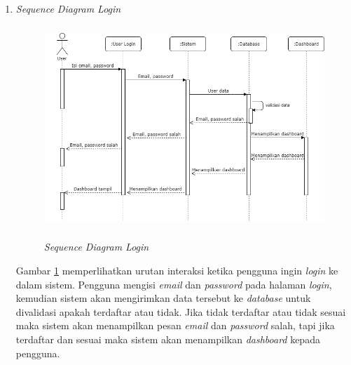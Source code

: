\begin{enumerate}
	\item \textit{Sequence Diagram Login}
	\begin{figure}[H]
		\centering
		{\includegraphics [width = 12cm, height= 7.6cm]{gambar/sequence/login}}
		\caption{\textit{Sequence Diagram Login}}
		\label{seq login}
	\end{figure}
	\par Gambar \ref*{seq login} memperlihatkan urutan interaksi ketika pengguna ingin \textit{login} ke dalam sistem. Pengguna mengisi \textit{email} dan \textit{password} pada halaman \textit{login}, kemudian sistem akan mengirimkan data tersebut ke \textit{database} untuk divalidasi apakah terdaftar atau tidak. Jika tidak terdaftar atau tidak sesuai maka sistem akan menampilkan pesan \textit{email} dan \textit{password} salah, tapi jika terdaftar dan sesuai maka sistem akan menampilkan \textit{dashboard} kepada pengguna.


\end{enumerate}
